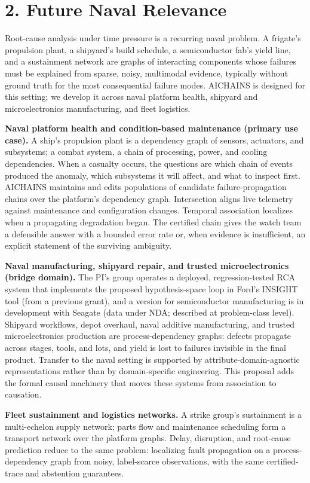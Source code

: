 \documentclass[12pt]{article}
\begin{document}
\section*{2. Future Naval Relevance}

Root-cause analysis under time pressure is a recurring naval problem. A frigate's propulsion plant, a shipyard's build schedule, a semiconductor fab's yield line, and a sustainment network are graphs of interacting components whose failures must be explained from sparse, noisy, multimodal evidence, typically without ground truth for the most consequential failure modes. AICHAINS is designed for this setting; we develop it across naval platform health, shipyard and microelectronics manufacturing, and fleet logistics.

\textbf{Naval platform health and condition-based maintenance (primary use case).} A ship's propulsion plant is a dependency graph of sensors, actuators, and subsystems; a combat system, a chain of processing, power, and cooling dependencies. When a casualty occurs, the questions are which chain of events produced the anomaly, which subsystems it will affect, and what to inspect first. AICHAINS maintains and edits populations of candidate failure-propagation chains over the platform's dependency graph. Intersection aligns live telemetry against maintenance and configuration changes. Temporal association localizes when a propagating degradation began. The certified chain gives the watch team a defensible answer with a bounded error rate or, when evidence is insufficient, an explicit statement of the surviving ambiguity.

\textbf{Naval manufacturing, shipyard repair, and trusted microelectronics (bridge domain).} The PI's group operates a deployed, regression-tested RCA system that implements the proposed hypothesis-space loop in Ford's INSIGHT tool (from a previous grant), and a version for semiconductor manufacturing is in development with Seagate (data under NDA; described at problem-class level). Shipyard workflows, depot overhaul, naval additive manufacturing, and trusted microelectronics production are process-dependency graphs: defects propagate across stages, tools, and lots, and yield is lost to failures invisible in the final product. Transfer to the naval setting is supported by attribute-domain-agnostic representations rather than by domain-specific engineering. This proposal adds the formal causal machinery that moves these systems from association to causation.

\textbf{Fleet sustainment and logistics networks.} A strike group's sustainment is a multi-echelon supply network; parts flow and maintenance scheduling form a transport network over the platform graphs. Delay, disruption, and root-cause prediction reduce to the same problem: localizing fault propagation on a process-dependency graph from noisy, label-scarce observations, with the same certified-trace and abstention guarantees.
\end{document}
